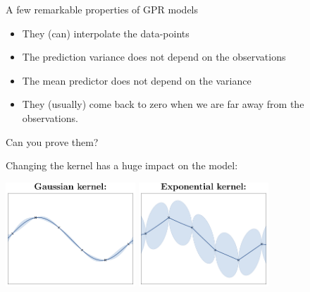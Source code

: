\documentclass{beamer}
\begin{document}
\begin{frame}{}
A few remarkable properties of GPR models 
\begin{itemize}
	\item They (can) interpolate the data-points
	\item The prediction variance does not depend on the observations
	\item The mean predictor does not depend on the variance
	\item They (usually) come back to zero when we are far away from the observations.
\end{itemize}
Can you prove them?
\end{frame}


\begin{frame}{}
Changing the kernel \alert{has a huge impact on the model}:\\ 
\vspace{5mm}
\begin{center}
\includegraphics[height=3.9cm]{figures/Fig2-GP-rbf} \qquad 
\includegraphics[height=3.9cm]{figures/Fig2-GP-exp}
\end{center}
\end{frame}
\end{document}
